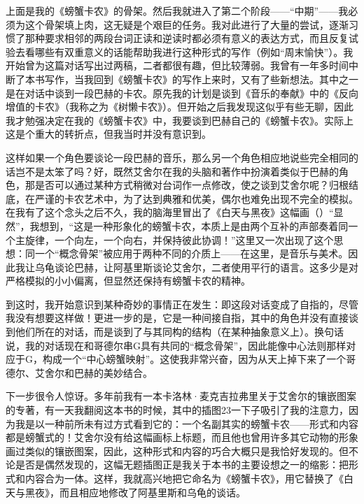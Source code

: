 \begin{description}[wide,format=\em\itemcolon,labelsep=\ccwd]
\item[中期]上面是我的《螃蟹卡农》的骨架。然后我就进入了第二个阶段——“中期”——我必须为这个骨架填上肉，这无疑是个艰巨的任务。我对此进行了大量的尝试，逐渐习惯了那种要求相邻的两段台词正读和逆读时都必须有意义的表达方式，而且反复试验去看哪些有双重意义的话能帮助我进行这种形式的写作（例如“周末愉快”）。我开始曾为这篇对话写出过两稿，二者都很有趣，但比较薄弱。我曾有一年多时间中断了本书写作，当我回到《螃蟹卡农》的写作上来时，又有了些新想法。其中之一是在对话中谈到一段巴赫的卡农。原先我的计划是谈到《音乐的奉献》中的《反向增值的卡农》（我称之为《树懒卡农》）。但开始之后我发现这似乎有些无聊，因此我才勉强决定在我的《螃蟹卡农》中，我要谈到巴赫自己的《螃蟹卡农》。实际上这是个重大的转折点，但我当时并没有意识到。

这样如果一个角色要谈论一段巴赫的音乐，那么另一个角色相应地说些完全相同的话岂不是太笨了吗？好，既然艾舍尔在我的头脑和著作中扮演着类似于巴赫的角色，那是否可以通过某种方式稍微对台词作一点修改，使之谈到艾舍尔呢？归根结底，在严谨的卡农艺术中，为了达到典雅和优美，偶尔也难免出现不完全的模拟。在我有了这个念头之后不久，我的脑海里冒出了《白天与黑夜》这幅画（）“显然”，我想到，“这是一种形象化的螃蟹卡农，本质上是由两个互补的声部奏着同一个主旋律，一个向左，一个向右，并保持彼此协调！”这里又一次出现了这个思想：同一个“概念骨架”被应用于两种不同的介质上——在这里，是音乐与美术。因此我让乌龟谈论巴赫，让阿基里斯谈论艾舍尔，二者使用平行的语言。这多少是对严格模拟的小小偏离，但显然还保持有螃蟹卡农的精神。

到这时，我开始意识到某种奇妙的事情正在发生：即这段对话变成了自指的，尽管我没有想要这样做！更进一步的是，它是一种间接自指，其中的角色并没有直接谈到他们所在的对话，而是谈到了与其同构的结构（在某种抽象意义上）。换句话说，我的对话现在和哥德尔串G具有共同的“概念骨架”，因此能像中心法则那样对应于G，构成一个“中心螃蟹映射”。这使我非常兴奋，因为从天上掉下来了一个哥德尔、艾舍尔和巴赫的美妙结合。

\item[后期]下一步很令人惊讶。多年前我有一本卡洛林·麦克吉拉弗里关于艾舍尔的镶嵌图案的专著，有一天我翻阅这本书的时候，其中的插图23一下子吸引了我的注意力，因为我是以一种前所未有过方式看到它的：一个名副其实的螃蟹卡农——形式和内容都是螃蟹式的！艾舍尔没有给这幅画标上标题，而且他也曾用许多其它动物的形象画过类似的镶嵌图案，因此，这种形式和内容的巧合大概只是我恰好发现的。但不论是否是偶然发现的，这幅无题插图正是我关于本书的主要设想之一的缩影：把形式和内容合为一体。这样，我就高兴地把它命名为《螃蟹卡农》，用它替换了《白天与黑夜》，而且相应地修改了阿基里斯和乌龟的谈话。


\end{description}
